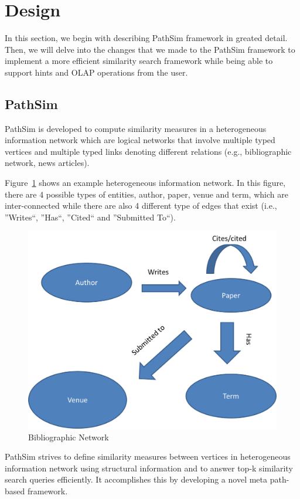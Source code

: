 \section{Design}
\label{sec:design}

In this section, we begin with describing PathSim framework in greated detail.
Then, we will delve into the changes that we made to the PathSim framework to
implement a more efficient similarity search framework while being able to
support hints and OLAP operations from the user.

\subsection{PathSim}

PathSim is developed to compute
similarity measures in a heterogeneous information network which are logical
networks that involve multiple typed vertices and multiple typed links denoting
different relations (e.g., bibliographic network, news articles).

Figure~\ref{fig:relationship} shows an example heterogeneous information
network.  In this figure, there are 4 possible types of entities, author,
paper, venue and term, which are inter-connected while there are also 4
different type of edges that exist (i.e., ''Writes``, ''Has``, ''Cited`` and
''Submitted To``).

\begin{figure}[H]
    \centering
    \includegraphics[width=0.6\linewidth]{./figs/relationship.png}
    \caption{Bibliographic Network}
    \label{fig:relationship}
\end{figure}

PathSim strives to define similarity measures between vertices in heterogeneous
information network using structural information and to answer top-k similarity
search queries efficiently. It accomplishes this by developing a novel meta
path-based framework.


